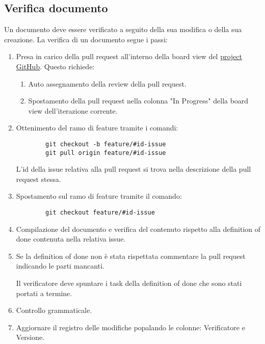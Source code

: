 \documentclass[a4paper, 12pt]{article}
\begin{document}
\subsection{Verifica documento}
\label{subsec:ver}
Un documento deve essere verificato a seguito della sua modifica o della sua creazione.
La verifica di un documento segue i passi:
\begin{enumerate}
    \item Presa in carico della pull request all'interno della board view del \href{https://github.com/orgs/ALT-F4-eng/projects}{project GitHub}.
    Questo richiede:
    \begin{enumerate}
        \item Auto assegnamento della review della pull request.
        \item Spostamento della pull request nella colonna "In Progress" della board view dell'iterazione corrente.
    \end{enumerate}
    
    \item Ottenimento del ramo di feature tramite i comandi:
    \begin{lstlisting}
        git checkout -b feature/#id-issue
        git pull origin feature/#id-issue
    \end{lstlisting}
    L'id della issue relativa alla pull request si trova nella descrizione della pull request stessa.

    \item Spostamento sul ramo di feature tramite il comando:
    \begin{lstlisting}
        git checkout feature/#id-issue
    \end{lstlisting}

    \item Compilazione del documento e verifica del contenuto rispetto alla definition of done contenuta nella relativa issue.
    
    \item Se la definition of done non è stata rispettata commentare la pull request indicando le parti mancanti.
    
    Il verificatore deve spuntare i task della definition of done che sono stati portati a termine.
    
    \item Controllo grammaticale.
    
    \item Aggiornare il registro delle modifiche popalando le colonne: Verificatore e Versione.
    

\end{enumerate}
\end{document}
